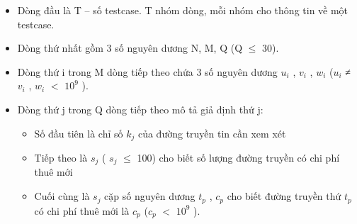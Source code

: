 \begin{itemize}
	\item Dòng đầu là T – số testcase. T nhóm dòng, mỗi nhóm cho thông tin về một testcase.
	\item Dòng thứ nhất gồm 3 số nguyên dương N, M, Q (Q  $\le$  30).
	\item Dòng thứ i trong M dòng tiếp theo chứa 3 số nguyên dương $u_{i}$ , $v_{i}$ , $w_{i}$ ($u_{i}$ ≠ $v_{i}$ , $w_{i}$ $<$ $10^{9}$ ).
	\item Dòng thứ j trong Q dòng tiếp theo mô tả giả định thứ j:
\begin{itemize}
	\item Số đầu tiên là chỉ số $k_{j}$ của đường truyền tin cần xem xét
	\item Tiếp theo là $s_{j}$ ( $s_{j}$  $\le$  100) cho biết số lượng đường truyền có chi phí thuê mới
	\item Cuối cùng là $s_{j}$ cặp số nguyên dương $t_{p}$ , $c_{p}$ cho biết đường truyền thứ $t_{p}$ có chi phí thuê mới là $c_{p}$ ($c_{p}$ $<$ $10^{9}$ ).
\end{itemize}
\end{itemize}